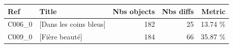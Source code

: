 \begin{small}
\begin{tabular}{l|l|r|r|r}
\textbf{Ref} & \textbf{Title} & \textbf{Nbs objects} &  \textbf{Nbs diffs} & \textbf{Metric} \\ \hline
	C006\_0 & [Dans les coins bleus]  & 182 & 25 & 13.74 \% \\ 
		C009\_0 & [Fière beauté]  & 184 & 66 & 35.87 \% \\ 
		\hline
\end{tabular}
\end{small}
	